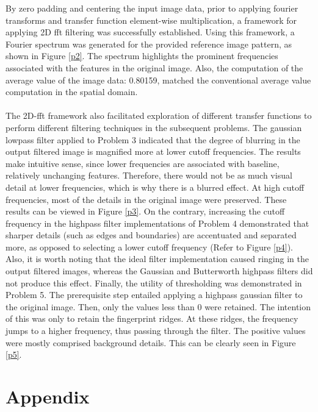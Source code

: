 \documentclass[./rarnold_report4.tex]{subfiles}
\begin{document}
\noindent By zero padding and centering the input image data, prior to applying fourier transforms and transfer function element-wise multiplication, a framework for applying 2D fft filtering was successfully established.  Using this framework, a Fourier spectrum was generated for the provided reference image pattern, as shown in Figure \ref{p2}.  The spectrum highlights the prominent frequencies associated with the features in the original image.  Also, the computation of the average value of the image data: 0.80159, matched the conventional average value computation in the spatial domain.
\\ \\
\noindent The 2D-fft framework also facilitated exploration of different transfer functions to perform different filtering techniques in the subsequent problems.  The gaussian lowpass filter applied to Problem 3 indicated that the degree of blurring in the output filtered image is magnified more at lower cutoff frequencies. The results make intuitive sense, since lower frequencies are associated with baseline, relatively unchanging features.  Therefore, there would not be as much visual detail at lower frequencies, which is why there is a blurred effect. At high cutoff frequencies, most of the details in the original image were preserved.  These results can be viewed in Figure \ref{p3}.  On the contrary, increasing the cutoff frequency in the highpass filter implementations of Problem 4 demonstrated that sharper details (such as edges and boundaries) are accentuated and separated more, as opposed to selecting a lower cutoff frequency (Refer to Figure \ref{p4}).  Also, it is worth noting that the ideal filter implementation caused ringing in the output filtered images, whereas the Gaussian and Butterworth highpass filters did not produce this effect.   Finally, the utility of thresholding was demonstrated in Problem 5.  The prerequisite step entailed applying a highpass gaussian filter to the original image.  Then, only the values less than 0 were retained.  The intention of this was only to retain the fingerprint ridges.  At these ridges, the frequency jumps to a higher frequency, thus passing through the filter. The positive values were mostly comprised background details.  This can be clearly seen in Figure \ref{p5}.

\clearpage

\section*{Appendix}
\end{document}

